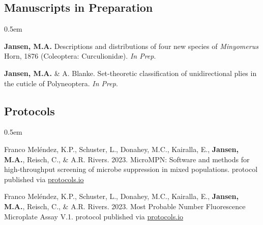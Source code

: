 \documentclass[12pt,a4paper]{article}
\begin{document}
	\subsection*{Manuscripts in Preparation}
		\begin{description}
			\itemsep0.5em
			\item \textbf{Jansen, M.A.} Descriptions and distributions of four new species of \textit{Minyomerus} Horn, 1876 (Coleoptera: Curculionid\ae). \textit{In Prep}.
			\item \textbf{Jansen, M.A.} \& A. Blanke. Set-theoretic classification of unidirectional plies in the cuticle of Polyneoptera. \textit{In Prep}.
		\end{description}
	
	\subsection*{Protocols}
	\begin{description}
		\itemsep0.5em
		\item Franco Mel\'{e}ndez, K.P., Schuster, L., Donahey, M.C., Kairalla, E., \textbf{Jansen, M.A.}, Reisch, C., \& A.R. Rivers. 2023. MicroMPN: Software and methods for high-throughput screening of microbe suppression in mixed populations. protocol published via \href{dx.doi.org/10.17504/protocols.io.81wgbymenvpk/v1}{protocols.io}
		\item Franco Mel\'{e}ndez, K.P., Schuster, L., Donahey, M.C., Kairalla, E., \textbf{Jansen, M.A.}, Reisch, C., \& A.R. Rivers. 2023. Most Probable Number Fluorescence Microplate Assay V.1. protocol published via \href{dx.doi.org/10.17504/protocols.io.q26g7yqk1gwz/v1}{protocols.io}
	\end{description}
\end{document}
